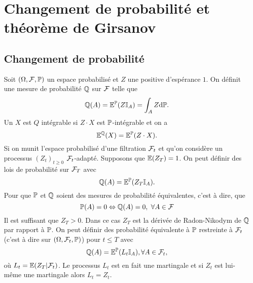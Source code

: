 \section{Changement de probabilité et théorème de Girsanov}
\subsection{Changement de probabilité}
Soit $(\Omega, \mathcal{F}, \mathbb{P})$ un espace probabilisé et $Z$ une \va positive d'espérance $1$. On définit une mesure de probabilité $\mathbb{Q}$ sur $\mathcal{F}$ telle que 
$$
\mathbb{Q}(A)
 = \mathbb{E}^{\mathbb{P}}(Z\mathbb{I}_A) = \int_A Z\text{d}\mathbb{P}.
$$
Un \va $X$ est $Q$ intégrable si $Z\cdot X$ est $\mathbb{P}$-intégrable et on a 
$$
\mathbb{E}^{\mathbb{Q}}(X) = \mathbb{E}^{\mathbb{P}}(Z\cdot X).
$$
Si on munit l'espace probabilisé d'une filtration $\mathcal{F}_t$ et qu'on considère un processus $(Z_t)_{t\geq 0}$ $\mathcal{F}_t$-adapté. Supposons que $\mathbb{E}(Z_T) = 1$. On peut définir des lois de probabilité sur $\mathcal{F}_T$ avec 
$$
\mathbb{Q}(A) = \mathbb{E}^{\mathbb{P}}(Z_T\mathbb{I}_A).
$$
Pour que $\mathbb{P}$ et $\mathbb{Q}$ soient des mesures de probabilité équivalentes, c'est à dire, que 
$$
\mathbb{P}(A) = 0\Leftrightarrow \mathbb{Q}(A) = 0,\text{ }\forall A\in\mathcal{F}
$$
Il est suffisant que $Z_T>0$. Dans ce cas $Z_T$ est la dérivée de Radon-Nikodym de $\mathbb{Q}$ par rapport à $\mathbb{P}$. On peut définir des probabilité équivalente à $\mathbb{P}$ restreinte à $\mathcal{F}_t$ (c'est à dire sur $(\Omega,\mathcal{F}_t, \mathbb{P})$) pour $t\leq T$ avec 
$$
\mathbb{Q}(A) = \mathbb{E}^{\mathbb{P}}(L_t\mathbb{I}_A),\forall A\in \mathcal{F}_t,
$$
où $L_t = \mathbb{E}(Z_T|\mathcal{F}_t)$. Le processus $L_t$ est en fait une martingale et si $Z_t$ est lui-même une martingale alors $L_t = Z_t$.

